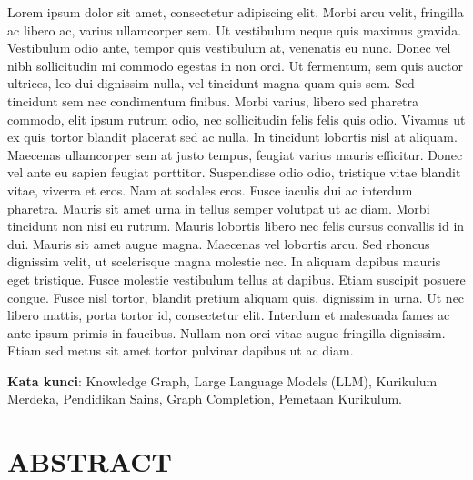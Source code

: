 \documentclass[
]{article}
\begin{document}
Lorem ipsum dolor sit amet, consectetur adipiscing elit. Morbi arcu
velit, fringilla ac libero ac, varius ullamcorper sem. Ut vestibulum
neque quis maximus gravida. Vestibulum odio ante, tempor quis vestibulum
at, venenatis eu nunc. Donec vel nibh sollicitudin mi commodo egestas in
non orci. Ut fermentum, sem quis auctor ultrices, leo dui dignissim
nulla, vel tincidunt magna quam quis sem. Sed tincidunt sem nec
condimentum finibus. Morbi varius, libero sed pharetra commodo, elit
ipsum rutrum odio, nec sollicitudin felis felis quis odio. Vivamus ut ex
quis tortor blandit placerat sed ac nulla. In tincidunt lobortis nisl at
aliquam. Maecenas ullamcorper sem at justo tempus, feugiat varius mauris
efficitur. Donec vel ante eu sapien feugiat porttitor. Suspendisse odio
odio, tristique vitae blandit vitae, viverra et eros. Nam at sodales
eros. Fusce iaculis dui ac interdum pharetra. Mauris sit amet urna in
tellus semper volutpat ut ac diam. Morbi tincidunt non nisi eu rutrum.
Mauris lobortis libero nec felis cursus convallis id in dui. Mauris sit
amet augue magna. Maecenas vel lobortis arcu. Sed rhoncus dignissim
velit, ut scelerisque magna molestie nec. In aliquam dapibus mauris eget
tristique. Fusce molestie vestibulum tellus at dapibus. Etiam suscipit
posuere congue. Fusce nisl tortor, blandit pretium aliquam quis,
dignissim in urna. Ut nec libero mattis, porta tortor id, consectetur
elit. Interdum et malesuada fames ac ante ipsum primis in faucibus.
Nullam non orci vitae augue fringilla dignissim. Etiam sed metus sit
amet tortor pulvinar dapibus ut ac diam.

\textbf{Kata kunci}: Knowledge Graph, Large Language Models (LLM),
Kurikulum Merdeka, Pendidikan Sains, Graph Completion, Pemetaan
Kurikulum.

\hypertarget{abstract}{%
\section{ABSTRACT}\label{abstract}}
\end{document}
